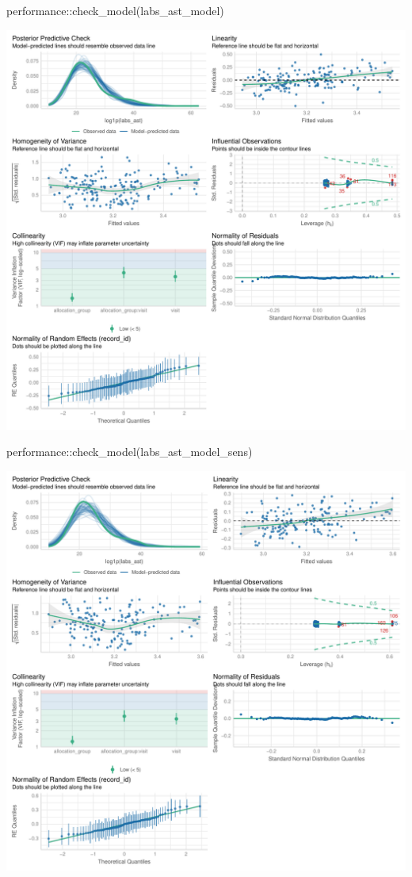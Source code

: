 \documentclass[
  letterpaper,
  DIV=11,
  numbers=noendperiod]{scrartcl}
\newenvironment{Shaded}{\begin{snugshade}}{\end{snugshade}}
\newcommand{\FunctionTok}[1]{\textcolor[rgb]{0.28,0.35,0.67}{#1}}
\newcommand{\NormalTok}[1]{\textcolor[rgb]{0.00,0.23,0.31}{#1}}
\newcommand{\SpecialCharTok}[1]{\textcolor[rgb]{0.37,0.37,0.37}{#1}}
\begin{document}
\begin{Shaded}
\begin{Highlighting}[]
\NormalTok{performance}\SpecialCharTok{::}\FunctionTok{check\_model}\NormalTok{(labs\_ast\_model)}
\end{Highlighting}
\end{Shaded}

\includegraphics{Outcomes_V1V2V3_files/figure-pdf/labs_ast_4-1.pdf}

\begin{Shaded}
\begin{Highlighting}[]
\NormalTok{performance}\SpecialCharTok{::}\FunctionTok{check\_model}\NormalTok{(labs\_ast\_model\_sens)}
\end{Highlighting}
\end{Shaded}

\includegraphics{Outcomes_V1V2V3_files/figure-pdf/labs_ast_4-2.pdf}
\end{document}
